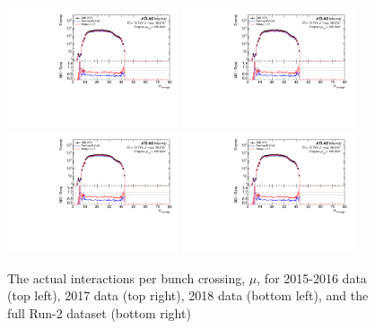\begin{figure}[h!]
  \centering
  \includegraphics[page=5,width=0.45\textwidth]{figures/ZjetOmnifoldMCDataComp.pdf}
  \includegraphics[page=6,width=0.45\textwidth]{figures/ZjetOmnifoldMCDataComp.pdf} \\
  \includegraphics[page=7,width=0.45\textwidth]{figures/ZjetOmnifoldMCDataComp.pdf}
  \includegraphics[page=8,width=0.45\textwidth]{figures/ZjetOmnifoldMCDataComp.pdf}
  \caption{The actual interactions per bunch crossing, $\mu$, for 2015-2016 data (top left), 2017 data (top right), 2018 data (bottom left), and the full Run-2 dataset (bottom right)}
  \label{fig:MuActual}
\end{figure}

